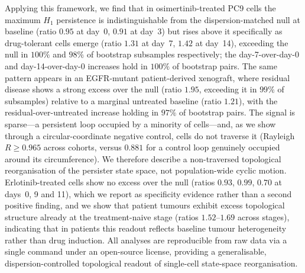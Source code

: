 Applying this framework, we find that in osimertinib-treated PC9
cells the maximum $H_1$ persistence is indistinguishable from the
dispersion-matched null at baseline (ratio $0.95$ at day~0, $0.91$ at
day~3) but rises above it specifically as drug-tolerant cells emerge
(ratio $1.31$ at day~7, $1.42$ at day~14), exceeding the null in
$100\%$ and $98\%$ of bootstrap subsamples respectively; the
day-7-over-day-0 and day-14-over-day-0 increases hold in $100\%$ of
bootstrap pairs. The same pattern appears in an EGFR-mutant
patient-derived xenograft, where residual disease shows a strong
excess over the null (ratio $1.95$, exceeding it in $99\%$ of
subsamples) relative to a marginal untreated baseline (ratio $1.21$),
with the residual-over-untreated increase holding in $97\%$ of
bootstrap pairs. The signal is sparse---a persistent loop occupied by
a minority of cells---and, as we show through a circular-coordinate
negative control, cells do not traverse it (Rayleigh
$R \geq 0.965$ across cohorts, versus $0.881$ for a control loop
genuinely occupied around its circumference). We therefore describe a
non-traversed topological reorganisation of the persister state space,
not population-wide cyclic motion. Erlotinib-treated cells show no
excess over the null (ratios $0.93$, $0.99$, $0.70$ at days~0, 9 and
11), which we report as specificity evidence rather than a second
positive finding, and we show that patient tumours exhibit excess
topological structure already at the treatment-naive stage (ratios
$1.52$--$1.69$ across stages), indicating that in patients this
readout reflects baseline tumour heterogeneity rather than
drug induction. All analyses are reproducible from raw data via a
single command under an open-source license, providing a
generalisable, dispersion-controlled topological readout of
single-cell state-space reorganisation.
